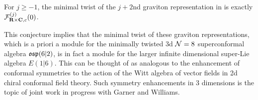 \documentclass[../main.tex]{subfiles}
\begin{document}
\begin{conj}\label{conj:e16gravitonrep}
For $j\geq -1$, the minimal twist of the $j+2$nd graviton representation in \cite[Eq. (2.15, 2.16)]{Bhattacharya:2008zy} is exactly $\mathcal{F}^{(j)}_{\mathbf{R}\times \mathbf{C}, c}(0)$. 
\end{conj}

\begin{rmk}\label{rmk:e16enhance}
This conjecture implies that the minimal twist of these graviton representations, which is a priori a module for the minimally twisted 3d $\mathcal{N}=8$ superconformal algebra $\mathfrak{osp}(6|2)$, is in fact a module for the larger infinite dimensional super-Lie algebra $E(1|6)$. This can be thought of as analogous to the enhancement of conformal symmetries to the action of the Witt algebra of vector fields in 2d chiral conformal field theory. Such symmetry enhancements in 3 dimensions is the topic of joint work in progress with Garner and Williams.
\end{rmk}
\end{document}
